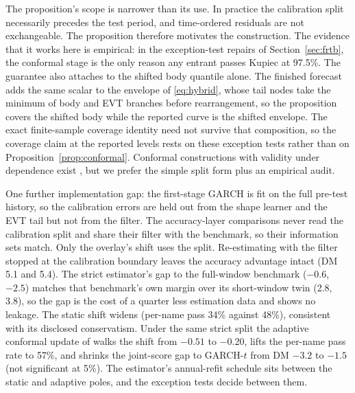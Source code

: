 \documentclass[11pt]{article}
\theoremstyle{remark}
\begin{document}
The proposition's scope is narrower than its use. In practice the calibration split necessarily precedes the test period, and time-ordered residuals are not exchangeable. The proposition therefore motivates the construction. The evidence that it works here is empirical: in the exception-test repairs of Section~\ref{sec:frtb}, the conformal stage is the only reason any entrant passes Kupiec at 97.5\%. The guarantee also attaches to the shifted body quantile alone. The finished forecast adds the same scalar to the envelope of \eqref{eq:hybrid}, whose tail nodes take the minimum of body and EVT branches before rearrangement, so the proposition covers the shifted body while the reported curve is the shifted envelope. The exact finite-sample coverage identity need not survive that composition, so the coverage claim at the reported levels rests on these exception tests rather than on Proposition~\ref{prop:conformal}. Conformal constructions with
validity under dependence exist \citep{chernozhukov2018conformal, barber2023, gibbs2021aci}, but we
prefer the simple split form plus an empirical audit.

One further
implementation gap: the first-stage
GARCH is fit on the full pre-test history, so the calibration errors
are held out from the shape learner and the EVT tail but not from the
filter. The accuracy-layer comparisons never read the calibration split
and share their filter with the benchmark, so their information sets
match. Only the overlay's shift uses the split. Re-estimating with the filter stopped at the calibration boundary leaves the accuracy advantage intact (DM 5.1 and 5.4). The strict estimator's gap to the full-window benchmark ($-0.6$, $-2.5$) matches that benchmark's own margin over its short-window twin (2.8, 3.8), so the gap is the cost of a quarter less estimation data and shows no leakage. The static shift widens (per-name pass 34\% against
48\%), consistent with its disclosed conservatism. Under the same strict
split the adaptive conformal update of \citet{gibbs2021aci} walks the shift from
$-0.51$ to $-0.20$, lifts the per-name pass rate to 57\%, and shrinks the
joint-score gap to GARCH-$t$ from DM $-3.2$ to $-1.5$ (not significant at
5\%). The estimator's annual-refit
schedule sits between the static and adaptive poles, and the exception
tests decide between them.
\end{document}
